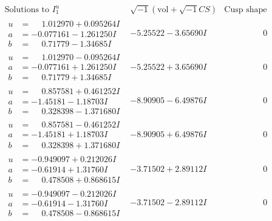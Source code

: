\documentclass[1p]{elsarticle_modified}
\theoremstyle{definition}
\newcommand{\I}{\sqrt{-1}}
\begin{document}
$$\begin{array}{c|c|c}  
\text{Solutions to }I^u_{1}& \I (\text{vol} + \sqrt{-1}CS) & \text{Cusp shape}\\
 \hline 
\begin{aligned}
u &= \phantom{-}1.012970 + 0.095264 I \\
a &= -0.077161 - 1.261250 I \\
b &= \phantom{-}0.71779 - 1.34685 I\end{aligned}
 & -5.25522 - 3.65690 I & \phantom{-0.000000 } 0 \\ \hline\begin{aligned}
u &= \phantom{-}1.012970 - 0.095264 I \\
a &= -0.077161 + 1.261250 I \\
b &= \phantom{-}0.71779 + 1.34685 I\end{aligned}
 & -5.25522 + 3.65690 I & \phantom{-0.000000 } 0 \\ \hline\begin{aligned}
u &= \phantom{-}0.857581 + 0.461252 I \\
a &= -1.45181 - 1.18703 I \\
b &= \phantom{-}0.328398 - 1.371680 I\end{aligned}
 & -8.90905 - 6.49876 I & \phantom{-0.000000 } 0 \\ \hline\begin{aligned}
u &= \phantom{-}0.857581 - 0.461252 I \\
a &= -1.45181 + 1.18703 I \\
b &= \phantom{-}0.328398 + 1.371680 I\end{aligned}
 & -8.90905 + 6.49876 I & \phantom{-0.000000 } 0 \\ \hline\begin{aligned}
u &= -0.949097 + 0.212026 I \\
a &= -0.61914 + 1.31760 I \\
b &= \phantom{-}0.478508 + 0.868615 I\end{aligned}
 & -3.71502 + 2.89112 I & \phantom{-0.000000 } 0 \\ \hline\begin{aligned}
u &= -0.949097 - 0.212026 I \\
a &= -0.61914 - 1.31760 I \\
b &= \phantom{-}0.478508 - 0.868615 I\end{aligned}
 & -3.71502 - 2.89112 I & \phantom{-0.000000 } 0 \\ \hline\begin{aligned}

\end{aligned}
\end{array}$$
\end{document}
